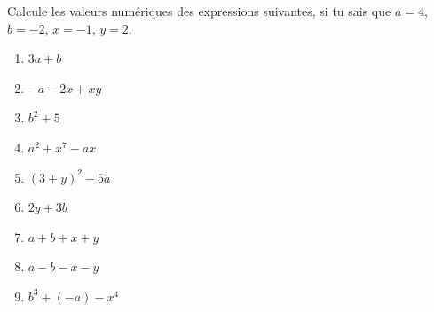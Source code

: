 %
%
Calcule les valeurs numériques des expressions suivantes, si tu sais que \(a=4\), \hfill \(b=-2\), \hfill  \(x=-1\), \hfill \(y=2\).
\begin{enumerate}[cols=3]
	\item \(3a + b\)
	\item \(-a - 2x + xy\)
	\item \(b^2 + 5\)
	\item \(a^2 + x^7 - ax\)
	\item \((3 + y)^2 - 5a\)
	\item \(2y + 3b\)
	\item \(a + b + x + y\)
	\item \(a - b - x - y\)
	\item \(b^3 + (-a) - x^4\)
\end{enumerate}
